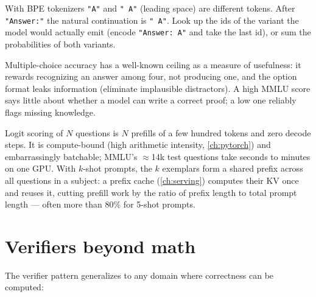 \begin{pitfall}
With BPE tokenizers \texttt{"A"} and \texttt{" A"} (leading space) are different tokens. After
\texttt{"Answer:"} the natural continuation is \texttt{" A"}. Look up the ids of the variant the
model would actually emit (encode \texttt{"Answer: A"} and take the last id), or sum the
probabilities of both variants.
\end{pitfall}

Multiple-choice accuracy has a well-known ceiling as a measure of usefulness: it rewards
recognizing an answer among four, not producing one, and the option format leaks information
(eliminate implausible distractors). A high MMLU score says little about whether a model can
write a correct proof; a low one reliably flags missing knowledge.

\begin{systemslens}
Logit scoring of $N$ questions is $N$ prefills of a few hundred tokens and zero decode steps. It is
compute-bound (high arithmetic intensity, \cref{ch:pytorch}) and embarrassingly batchable; MMLU's
$\approx$14k test questions take seconds to minutes on one GPU. With $k$-shot prompts, the
$k$ exemplars form a shared prefix across all questions in a subject: a prefix cache
(\cref{ch:serving}) computes their KV once and reuses it, cutting prefill work by the ratio of
prefix length to total prompt length --- often more than 80\% for 5-shot prompts.
\end{systemslens}

\section{Verifiers beyond math}\label{sec:eval:beyond}


The verifier pattern generalizes to any domain where correctness can be computed:

